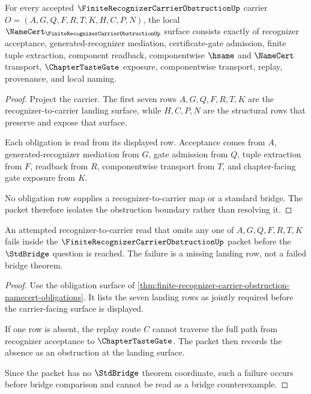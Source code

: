 \begin{theorem}
\label{thm:finite-recognizer-carrier-obstruction-namecert-obligations}
For every accepted $\FiniteRecognizerCarrierObstructionUp$ carrier $O=(A,G,Q,F,R,T,K,H,C,P,N)$, the local $\NameCert_{\FiniteRecognizerCarrierObstructionUp}$ surface consists exactly of recognizer acceptance, generated-recognizer mediation, certificate-gate admission, finite tuple extraction, component readback, componentwise $\hsame$ and $\NameCert$ transport, $\ChapterTasteGate$ exposure, componentwise transport, replay, provenance, and local naming.
\end{theorem}
\begin{proof}
Project the carrier. The first seven rows $A,G,Q,F,R,T,K$ are the recognizer-to-carrier landing surface, while $H,C,P,N$ are the structural rows that preserve and expose that surface.

Each obligation is read from its displayed row. Acceptance comes from $A$, generated-recognizer mediation from $G$, gate admission from $Q$, tuple extraction from $F$, readback from $R$, componentwise transport from $T$, and chapter-facing gate exposure from $K$.

No obligation row supplies a recognizer-to-carrier map or a standard bridge. The packet therefore isolates the obstruction boundary rather than resolving it.
\end{proof}

\begin{theorem}
\label{thm:finite-recognizer-carrier-obstruction-missing-row-refusal}
An attempted recognizer-to-carrier read that omits any one of $A,G,Q,F,R,T,K$ fails inside the $\FiniteRecognizerCarrierObstructionUp$ packet before the $\StdBridge$ question is reached. The failure is a missing landing row, not a failed bridge theorem.
\end{theorem}
\begin{proof}
Use the obligation surface of \autoref{thm:finite-recognizer-carrier-obstruction-namecert-obligations}. It lists the seven landing rows as jointly required before the carrier-facing surface is displayed.

If one row is absent, the replay route $C$ cannot traverse the full path from recognizer acceptance to $\ChapterTasteGate$. The packet then records the absence as an obstruction at the landing surface.

Since the packet has no $\StdBridge$ theorem coordinate, such a failure occurs before bridge comparison and cannot be read as a bridge counterexample.
\end{proof}

